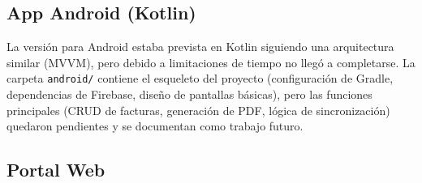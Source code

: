\subsection*{App Android (Kotlin)}

\begin{large}

La versión para Android estaba prevista en Kotlin siguiendo una arquitectura similar (MVVM), pero debido a limitaciones de tiempo no llegó a completarse. La carpeta \texttt{android/} contiene el esqueleto del proyecto (configuración de Gradle, dependencias de Firebase, diseño de pantallas básicas), pero las funciones principales (CRUD de facturas, generación de PDF, lógica de sincronización) quedaron pendientes y se documentan como trabajo futuro.

\end{large}

\subsection*{Portal Web}

